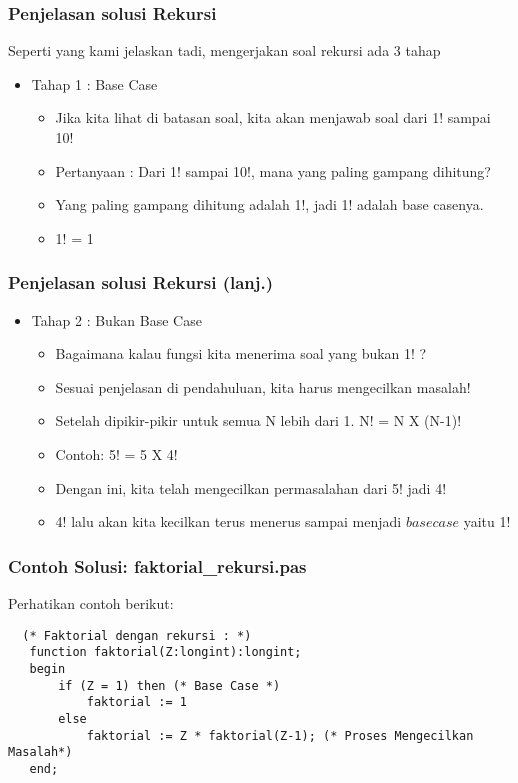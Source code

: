 \documentclass{beamer}
\begin{document}
\begin{frame}
\frametitle{Penjelasan solusi Rekursi}
Seperti yang kami jelaskan tadi, mengerjakan soal rekursi ada 3 tahap
\begin{itemize}
    \item Tahap 1 : Base Case
    \begin {itemize}
        \item Jika kita lihat di batasan soal, kita akan menjawab soal dari 1! sampai 10!
        \item Pertanyaan : Dari 1! sampai 10!, mana yang paling gampang dihitung?
        \item Yang paling gampang dihitung adalah 1!, jadi 1! adalah base casenya.
        \item 1! = 1
    \end {itemize}
\end{itemize}
\end{frame}

\begin{frame}
\frametitle{Penjelasan solusi Rekursi (lanj.) }
\begin{itemize}
    \item Tahap 2 : Bukan Base Case
    \begin {itemize}
        \item Bagaimana kalau fungsi kita menerima soal yang bukan 1! ?
        \item Sesuai penjelasan di pendahuluan, kita harus mengecilkan masalah!
        \item Setelah dipikir-pikir untuk semua N lebih dari 1. N! = N X (N-1)!
        \item Contoh: 5! = 5 X 4!
        \item Dengan ini, kita telah mengecilkan permasalahan dari 5! jadi 4!
        \item 4! lalu akan kita kecilkan terus menerus sampai menjadi $base case$ yaitu 1!
    \end {itemize}
\end{itemize}
\end{frame}

\begin{frame}[fragile]
\frametitle{Contoh Solusi: faktorial\_rekursi.pas}
Perhatikan contoh berikut:
\begin{lstlisting}
  (* Faktorial dengan rekursi : *)
   function faktorial(Z:longint):longint;
   begin
       if (Z = 1) then (* Base Case *)
           faktorial := 1
       else
           faktorial := Z * faktorial(Z-1); (* Proses Mengecilkan Masalah*)
   end;
\end{lstlisting}
\end{frame}
\end{document}
